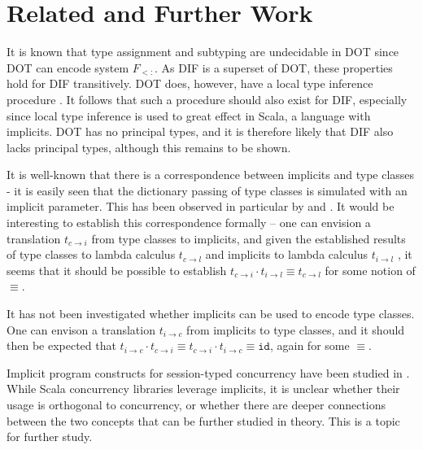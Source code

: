 \section{Related and Further Work}

It is known that type assignment and subtyping are undecidable in DOT
\cite{AR16} since DOT can encode system $F_{<:}$. As DIF is a superset of DOT,
these properties hold for DIF transitively. DOT does, however, have a local type
inference procedure \cite{PT00}. It follows that such a procedure should also
exist for DIF, especially since local type inference is used to great effect in
Scala, a language with implicits. DOT has no principal types, and it is
therefore likely that DIF also lacks principal types, although this remains to
be shown.

It is well-known that there is a correspondence between implicits and type
classes - it is easily seen that the dictionary passing of type classes is
simulated with an implicit parameter. This has been observed in particular by
\cite{OMO10} and \cite{OSCLYW12}. It would be interesting to establish this
correspondence formally -- one can envision a translation $t_{c \rightarrow i}$
from type classes to implicits, and given the established results of type
classes to lambda calculus $t_{c \rightarrow l}$ \cite{WB89} and implicits to
lambda calculus $t_{i \rightarrow l}$ \cite{OBLB18}, it seems that it should be
possible to establish $t_{c \rightarrow i} \cdot t_{i \rightarrow l} \equiv t_{c
\rightarrow l}$ for some notion of $\equiv$.

It has not been investigated whether implicits can be used to encode type
classes. One can envison a translation $t_{i \rightarrow c}$ from
implicits to type classes, and it should then be expected that $t_{i
\rightarrow c} \cdot t_{c \rightarrow i} \equiv t_{c \rightarrow i} \cdot t_{i
\rightarrow c} \equiv \mathtt{id}$, again for some $\equiv$.

Implicit program constructs for session-typed concurrency have been studied in
\cite{JB18}. While Scala concurrency libraries leverage implicits, it is unclear
whether their usage is orthogonal to concurrency, or whether there are deeper
connections between the two concepts that can be further studied in theory. This
is a topic for further study.
